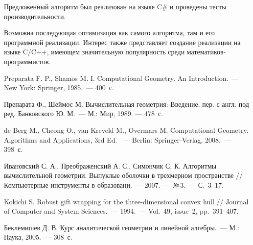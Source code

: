 \documentclass[14pt]{extarticle}
\begin{document}
Предложенный алгоритм был реализован на языке C\# и проведены тесты производительности.

Возможна последующая оптимизация как самого алгоритма, там и его программной реализации. Интерес также представляет создание реализации на языке C/C++, имеющем значительную популярность среди ма\-те\-ма\-ти\-ков-про\-грам\-мис\-тов.


\newpage

\newpage
{}
\begin{thebibliography}{9}
 Preparata F. P., Shamos M. I. Computational Geometry. An Introduction.~--- New York: Springer, 1985.~--- 400~с.

 Препарата Ф., Шеймос М. Вычислительная геометрия: Введение. пер. с англ. под ред. Банковского Ю. М.~--- М.: Мир, 1989. --- 478~с.

 de Berg M., Cheong O., van Kreveld M., Overmars M. Computational Geometry. Algorithms and Applications, 3rd Ed. ~--- Berlin: Springer-Verlag, 2008.~--- 398~с.

 Ивановский С. А., Преображенский А. С., Симончик С. К. Алгоритмы вычислительной геометрии. Выпуклые оболочки в трехмерном пространстве // Компьютерные инструменты в образовани.~--- 2007.~--- №\,3.~--- С.~3--17.

 Kokichi S. Robust gift wrapping for the three-dimensional convex hull // Journal of Computer and System Sciences.~--- 1994.~--- Vol.~49, issue~2, pp.~391--407.

 Беклемишев Д. В. Курс аналитической геометрии и линейной алгебры.~--- М.: Наука, 2005.~--- 308~с.
\end{thebibliography}


\label{lastpage}
\end{document}
